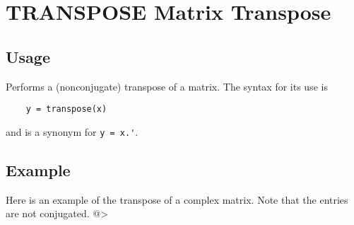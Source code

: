 \section{TRANSPOSE Matrix Transpose }

\subsection{Usage}

Performs a (nonconjugate) transpose of a matrix.  The syntax for
its use is
\begin{verbatim}
    y = transpose(x)
\end{verbatim}
and is a synonym for \verb|y = x.'|.
\subsection{Example}

Here is an example of the transpose of a complex matrix.  Note that
the entries are not conjugated.
@>
